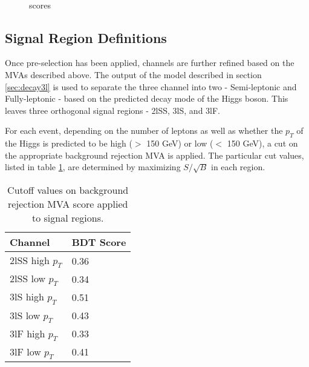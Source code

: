 \begin{figure}
  \\
  \label{fig:sigBkgScore}
  \caption{scores}
\end{figure}


\subsection{Signal Region Definitions}
\label{subsec:sigRegions}

Once pre-selection has been applied, channels are further refined based on the MVAs described above. The output of the model described in section \ref{sec:decay3l} is used to separate the three channel into two - Semi-leptonic and Fully-leptonic - based on the predicted decay mode of the Higgs boson. This leaves three orthogonal signal regions - 2lSS, 3lS, and 3lF. 

For each event, depending on the number of leptons as well as whether the $p_T$ of the Higgs is predicted to be high ($>$ 150 GeV) or low ($<$ 150 GeV), a cut on the appropriate background rejection MVA is applied. The particular cut values, listed in table \ref{tab:sigBkgCuts}, are determined by maximizing $S/\sqrt{B}$ in each region. 

\begin{table}[h!]
  \begin{center}
  \begin{tabular}{l|l}
  \hline\hline
  Channel & BDT Score \\
  \hline
  2lSS high $p_T$ & 0.36 \\
  2lSS low $p_T$ & 0.34 \\
  3lS high $p_T$ & 0.51 \\
  3lS low $p_T$ & 0.43 \\
  3lF high $p_T$ & 0.33 \\
  3lF low $p_T$ & 0.41 \\
  \hline
  \end{tabular}
  \end{center}
  \caption{Cutoff values on background rejection MVA score applied to signal regions.}
  \label{tab:sigBkgCuts}
\end{table}

